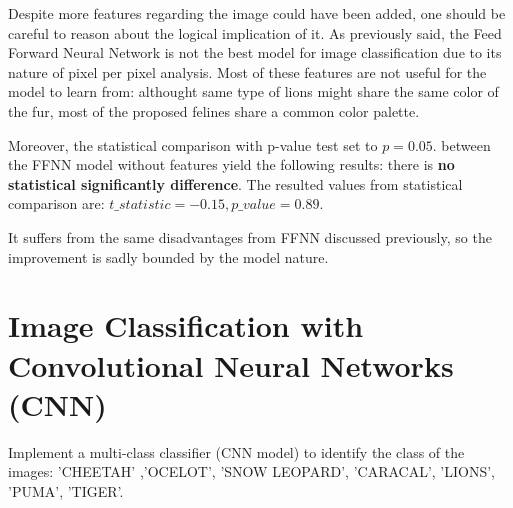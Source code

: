 \documentclass[11pt]{scrartcl}
\begin{document}
Despite more features regarding the image could have been added,
one should be careful to reason about the logical implication of it.
As previously said, the Feed Forward Neural Network 
is not the best model for image classification
due to its nature of pixel per pixel analysis.
Most of these features are not useful for the model to learn from:
althought same type of lions might share the same color of the fur,
most of the proposed felines share a common color palette.

Moreover, the statistical comparison with p-value test set to 
\( p = 0.05 \).
between the FFNN model without features yield 
the following results:
there is \textbf{no statistical significantly difference}. 
The resulted values from statistical comparison are:
\( t\_statistic = -0.15, p\_value = 0.89 \).

It suffers from the same disadvantages from FFNN discussed previously,
so the improvement is sadly bounded by the model nature.

\newpage

\section{Image Classification with Convolutional Neural Networks (CNN)}

Implement a multi-class classifier (CNN model) to identify the class of the images: 
'CHEETAH' ,'OCELOT', 'SNOW LEOPARD', 'CARACAL', 'LIONS', 'PUMA', 'TIGER'.
\end{document}
